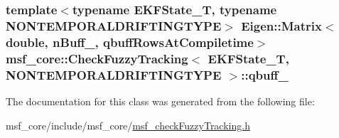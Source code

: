 \hypertarget{classmsf__core_1_1CheckFuzzyTracking_af1c7c576c8731d752a72d4e75f0a6078}{
\subsubsection[{qbuff\-\_\-}]{\setlength{\rightskip}{0pt plus 5cm}template$<$typename E\-K\-F\-State\-\_\-\-T, typename N\-O\-N\-T\-E\-M\-P\-O\-R\-A\-L\-D\-R\-I\-F\-T\-I\-N\-G\-T\-Y\-P\-E$>$ Eigen\-::\-Matrix$<$double, {\bf n\-Buff\-\_\-}, {\bf qbuff\-Rows\-At\-Compiletime}$>$ {\bf msf\-\_\-core\-::\-Check\-Fuzzy\-Tracking}$<$ E\-K\-F\-State\-\_\-\-T, N\-O\-N\-T\-E\-M\-P\-O\-R\-A\-L\-D\-R\-I\-F\-T\-I\-N\-G\-T\-Y\-P\-E $>$\-::qbuff\-\_\-\hspace{0.3cm}{\ttfamily [private]}}}\label{classmsf__core_1_1CheckFuzzyTracking_af1c7c576c8731d752a72d4e75f0a6078}


The documentation for this class was generated from the following file\-:\begin{DoxyCompactItemize}
\item 
msf\-\_\-core/include/msf\-\_\-core/\hyperlink{msf__checkFuzzyTracking_8h}{msf\-\_\-check\-Fuzzy\-Tracking.\-h}\end{DoxyCompactItemize}
